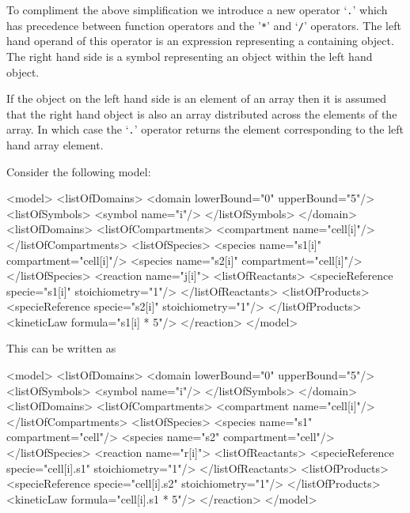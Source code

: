 \documentclass{cekarticle}
\begin{document}
To compliment the above simplification we introduce a new
operator `\texttt{.}' which has precedence between function
operators and the '\texttt{*}' and `\texttt{/}' operators. The
left hand operand of this operator is an expression representing
a containing object. The right hand side is a symbol representing
an object within the left hand object.

If the object on the left hand side is an element of an
array then it is assumed that the right hand object is also an array
distributed across the elements of the array. In which case
the `\texttt{.}' operator returns the element
corresponding to the left hand array element.

Consider the following model:

\begin{example}
<model>
    <listOfDomains>
        <domain lowerBound="0" upperBound="5"/>
            <listOfSymbols>
                <symbol name="i"/>
            </listOfSymbols>
        </domain>
    <listOfDomains>
    <listOfCompartments>
        <compartment name="cell[i]"/>
    </listOfCompartments>
    <listOfSpecies>
        <species name="s1[i]" compartment="cell[i]"/>
        <species name="s2[i]" compartment="cell[i]"/>
    </listOfSpecies>
    <reaction name="j[i]">
        <listOfReactants>
            <specieReference specie="s1[i]" stoichiometry="1"/>
        </listOfReactants>
        <listOfProducts>
            <specieReference specie="s2[i]" stoichiometry="1"/>
        </listOfProducts>
        <kineticLaw formula="s1[i] * 5"/>
    </reaction>
</model>
\end{example}
This can be written as
\begin{example}
<model>
    <listOfDomains>
        <domain lowerBound="0" upperBound="5"/>
            <listOfSymbols>
                <symbol name="i"/>
            </listOfSymbols>
        </domain>
    <listOfDomains>
    <listOfCompartments>
        <compartment name="cell[i]"/>
    </listOfCompartments>
    <listOfSpecies>
        <species name="s1" compartment="cell"/>
        <species name="s2" compartment="cell"/>
    </listOfSpecies>
    <reaction name="r[i]">
        <listOfReactants>
            <specieReference specie="cell[i].s1" stoichiometry="1"/>
        </listOfReactants>
        <listOfProducts>
            <specieReference specie="cell[i].s2" stoichiometry="1"/>
        </listOfProducts>
        <kineticLaw formula="cell[i].s1 * 5"/>
    </reaction>
</model>
\end{example}
\end{document}
